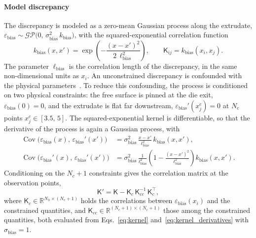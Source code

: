 \documentclass{elsarticle}
\newcommand{\mat}[1]{\mathsf{#1}}
\newcommand{\subbias}{\mathrm{bias}}
\begin{document}
\paragraph{Model discrepancy}
The discrepancy is modeled as a zero-mean Gaussian process along the extrudate,
$\varepsilon_{\subbias} \sim \mathcal{GP}\bigl(0,\,\sigma_{\subbias}^{2}\,
k_{\subbias}\bigr)$, with the squared-exponential correlation
function~\cite{rasmussen2006gpml}
\begin{equation}
k_{\subbias}(x,x')
= \exp\!\left(-\dfrac{(x - x')^{2}}{2\,\ell_{\subbias}^{2}}\right),
\qquad
\mat{K}_{ij} = k_{\subbias}(x_{i},x_{j}).
\label{eq:kernel}
\end{equation}
The parameter $\ell_{\subbias}$ is the correlation length of the discrepancy,
in the same non-dimensional units as $x_i$. An unconstrained discrepancy is
confounded with the physical parameters~\cite{brynjarsdottir2014}. To reduce
this confounding, the process is conditioned on two physical constraints: the
free surface is pinned at the die exit, $\varepsilon_{\subbias}(0)=0$, and the
extrudate is flat far downstream, $\varepsilon_{\subbias}'(x^{c}_{j})=0$ at
$N_c$ points $x^{c}_{j}\in[3.5,\,5]$. The squared-exponential kernel is
differentiable, so that the derivative of the process is again a Gaussian
process, with
\begin{equation}
\begin{aligned}
\operatorname{Cov}\bigl(\varepsilon_{\subbias}(x),\,
                        \varepsilon_{\subbias}'(x')\bigr)
&= \sigma_{\subbias}^{2}\,\frac{x-x'}{\ell_{\subbias}^{2}}\,
   k_{\subbias}(x,x'),
\\
\operatorname{Cov}\bigl(\varepsilon_{\subbias}'(x),\,
                        \varepsilon_{\subbias}'(x')\bigr)
&= \sigma_{\subbias}^{2}\,\frac{1}{\ell_{\subbias}^{2}}
   \left(1-\frac{(x-x')^{2}}{\ell_{\subbias}^{2}}\right)
   k_{\subbias}(x,x').
\end{aligned}
\label{eq:kernel_derivatives}
\end{equation}
Conditioning on the $N_c+1$ constraints gives the correlation matrix at the
observation points,
\begin{equation}
\mat{K}'
= \mat{K} - \mat{K}_{c}\,\mat{K}_{cc}^{-1}\,\mat{K}_{c}^{\top},
\label{eq:kernel_constrained}
\end{equation}
where $\mat{K}_{c}\in\mathbb{R}^{N_h\times(N_c+1)}$ holds the correlations
between $\varepsilon_{\subbias}(x_i)$ and the constrained quantities, and
$\mat{K}_{cc}\in\mathbb{R}^{(N_c+1)\times(N_c+1)}$ those among the constrained
quantities, both evaluated from Eqs.~\eqref{eq:kernel}
and~\eqref{eq:kernel_derivatives} with $\sigma_{\subbias}=1$.
\end{document}
